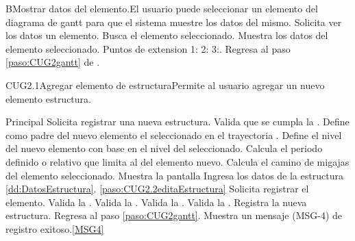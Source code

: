 	\begin{UCtrayectoriaA}{B}{Mostrar datos del elemento.}{El usuario puede seleccionar un elemento del diagrama de gantt para que el sistema muestre los datos del mismo.}
			\UCpaso[\UCactor] Solicita ver los datos un elemento.
			\UCpaso Busca el elemento seleccionado.
			\UCpaso Muestra los datos del elemento seleccionado. Puntos de extension 1: 2: 3:.
			\UCpaso Regresa al paso \ref{paso:CUG2gantt} de . 
	\end{UCtrayectoriaA}


	\begin{UseCase}{CUG2.1}{Agregar elemento de estructura}{Permite al usuario agregar un nuevo elemento estructura.}
	\end{UseCase}

	\begin{UCtrayectoria}{Principal}
		\UCpaso[\UCactor] Solicita registrar una nueva estructura.
		\UCpaso Valida que se cumpla la   .
		\UCpaso Define como padre del nuevo elemento el seleccionado en el  trayectoria . 
		\UCpaso Define el nivel del nuevo elemento con base en el nivel del seleccionado.
		\UCpaso Calcula el periodo definido o relativo que limita al del elemento nuevo.
		\UCpaso Calcula el camino de migajas del elemento seleccionado.
		\UCpaso Muestra la pantalla 
		\UCpaso [\UCactor] Ingresa los datos de la estructura \ref{dd:DatosEstructura}. \ref{paso:CUG2.2editaEstructura}
		\UCpaso [\UCactor] Solicita registrar el elemento.  
		\UCpaso Valida la   .
		\UCpaso Valida la   .
		\UCpaso Valida la  .
		\UCpaso Valida la  .
		\UCpaso Registra la nueva estructura.
		\UCpaso Regresa al paso \ref{paso:CUG2gantt}.
		\UCpaso Muestra un mensaje (MSG-4) de registro exitoso.\ref{MSG4}
	\end{UCtrayectoria}

